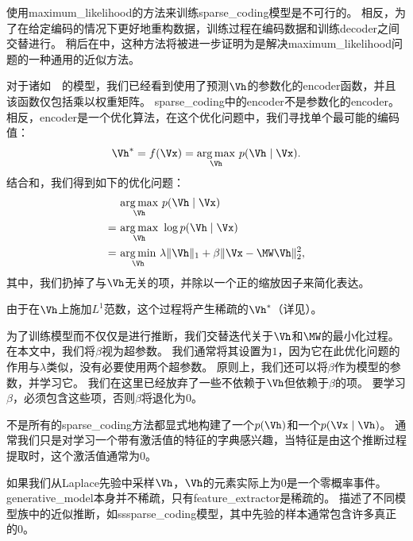 使用\gls{maximum_likelihood}的方法来训练\gls{sparse_coding}模型是不可行的。
相反，为了在给定编码的情况下更好地重构数据，训练过程在编码数据和训练\gls{decoder}之间交替进行。
稍后在中，这种方法将被进一步证明为是解决\gls{maximum_likelihood}问题的一种通用的近似方法。

对于诸如~~的模型，我们已经看到使用了预测$\Vh$的参数化的\gls{encoder}函数，并且该函数仅包括乘以权重矩阵。
\gls{sparse_coding}中的\gls{encoder}不是参数化的\gls{encoder}。
相反，\gls{encoder}是一个优化算法，在这个优化问题中，我们寻找单个最可能的编码值：
\begin{align}
\label{eqn:1315}
\Vh^* = f(\Vx) = \underset{\Vh}{\arg\max}\  p(\Vh\mid\Vx).
\end{align} %
结合和，我们得到如下的优化问题：
\begin{align}
\label{eqn:1316}
& \underset{\Vh}{\arg\max}\  p(\Vh\mid\Vx) \\
= ~& \underset{\Vh}{\arg\max}\ \log  p(\Vh\mid\Vx)\\
= ~& \underset{\Vh}{\arg\min}\ \lambda \Vert \Vh\Vert_1 + \beta  \Vert \Vx - \MW \Vh\Vert_2^2,
\end{align}
其中，我们扔掉了与$\Vh$无关的项，并除以一个正的缩放因子来简化表达。

由于在$\Vh$上施加$L^1$范数，这个过程将产生稀疏的$\Vh^*$（详见）。


为了训练模型而不仅仅是进行推断，我们交替迭代关于$\Vh$和$\MW$的最小化过程。
在本文中，我们将$\beta$视为超参数。
我们通常将其设置为$1$，因为它在此优化问题的作用与$\lambda$类似，没有必要使用两个超参数。 
原则上，我们还可以将$\beta$作为模型的参数，并学习它。
我们在这里已经放弃了一些不依赖于$\Vh$但依赖于$\beta$的项。
要学习$\beta$，必须包含这些项，否则$\beta$将退化为$0$。


不是所有的\gls{sparse_coding}方法都显式地构建了一个$p(\Vh)$和一个$p(\Vx\mid\Vh)$。 
通常我们只是对学习一个带有激活值的特征的字典感兴趣，当特征是由这个推断过程提取时，这个激活值通常为$0$。

如果我们从Laplace先验中采样$\Vh$，$\Vh$的元素实际上为$0$是一个零概率事件。
\gls{generative_model}本身并不稀疏，只有\gls{feature_extractor}是稀疏的。
\citet{Goodfeli-et-al-TPAMI-Deep-PrePrint-2013-small}描述了不同模型族中的近似推断，如\gls{ss}\gls{sparse_coding}模型，其中先验的样本通常包含许多真正的$0$。

